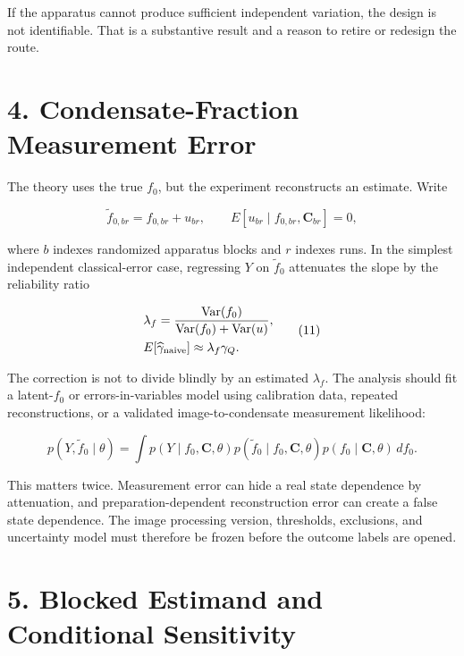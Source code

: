 \documentclass[
  american,
  11pt,
  letterpaper,
]{article}
\begin{document}
If the apparatus cannot produce sufficient independent variation, the design is not identifiable. That is a substantive result and a reason to retire or redesign the route.

\section{4. Condensate-Fraction Measurement Error}\label{condensate-fraction-measurement-error}

The theory uses the true \(f_0\), but the experiment reconstructs an estimate. Write

\begin{equation}
\widetilde f_{0,br}=f_{0,br}+u_{br},
\qquad E[u_{br}\mid f_{0,br},\mathbf C_{br}]=0 ,
\tag{10}
\end{equation}

where \(b\) indexes randomized apparatus blocks and \(r\) indexes runs. In the simplest independent classical-error case, regressing \(Y\) on \(\widetilde f_0\) attenuates the slope by the reliability ratio

\begin{equation}
\begin{aligned}
& \lambda_f
=\frac{\operatorname{Var}(f_0)}
{\operatorname{Var}(f_0)+\operatorname{Var}(u)}, \\
& E[\widehat\gamma_{\rm naive}]\approx\lambda_f\gamma_Q .
\end{aligned}
\tag{11}
\end{equation}

The correction is not to divide blindly by an estimated \(\lambda_f\). The analysis should fit a latent-\(f_0\) or errors-in-variables model using calibration data, repeated reconstructions, or a validated image-to-condensate measurement likelihood:

\begin{equation}
p(Y,\widetilde f_0\mid\theta)
=\int p(Y\mid f_0,\mathbf C,\theta)
p(\widetilde f_0\mid f_0,\mathbf C,\theta)
p(f_0\mid\mathbf C,\theta)\,df_0 .
\tag{12}
\end{equation}

This matters twice. Measurement error can hide a real state dependence by attenuation, and preparation-dependent reconstruction error can create a false state dependence. The image processing version, thresholds, exclusions, and uncertainty model must therefore be frozen before the outcome labels are opened.

\section{5. Blocked Estimand and Conditional Sensitivity}\label{blocked-estimand-and-conditional-sensitivity}
\end{document}
